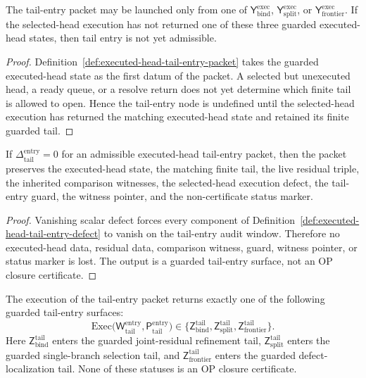 \begin{lemma}
\label{lem:executed-head-is-tail-entry-precondition}
The tail-entry packet may be launched only from one of \(\mathsf Y_{\mathrm{bind}}^{\mathrm{exec}}\), \(\mathsf Y_{\mathrm{split}}^{\mathrm{exec}}\), or \(\mathsf Y_{\mathrm{frontier}}^{\mathrm{exec}}\). If the selected-head execution has not returned one of these three guarded executed-head states, then tail entry is not yet admissible.
\end{lemma}

\begin{proof}
Definition~\ref{def:executed-head-tail-entry-packet} takes the guarded executed-head state as the first datum of the packet. A selected but unexecuted head, a ready queue, or a resolve return does not yet determine which finite tail is allowed to open. Hence the tail-entry node is undefined until the selected-head execution has returned the matching executed-head state and retained its finite guarded tail.
\end{proof}

\begin{lemma}
\label{lem:zero-tail-entry-defect-preserves-tail-entry-data}
If \(\Delta_{\mathrm{tail}}^{\mathrm{entry}}=0\) for an admissible executed-head tail-entry packet, then the packet preserves the executed-head state, the matching finite tail, the live residual triple, the inherited comparison witnesses, the selected-head execution defect, the tail-entry guard, the witness pointer, and the non-certificate status marker.
\end{lemma}

\begin{proof}
Vanishing scalar defect forces every component of Definition~\ref{def:executed-head-tail-entry-defect} to vanish on the tail-entry audit window. Therefore no executed-head data, residual data, comparison witness, guard, witness pointer, or status marker is lost. The output is a guarded tail-entry surface, not an OP closure certificate.
\end{proof}

\begin{definition}
\label{def:executed-head-tail-entry-output}
The execution of the tail-entry packet returns exactly one of the following guarded tail-entry surfaces:
\[
\mathrm{Exec}\bigl(\mathsf W_{\mathrm{tail}}^{\mathrm{entry}},
 \mathsf P_{\mathrm{tail}}^{\mathrm{entry}}\bigr)
\in
\{\mathsf Z_{\mathrm{bind}}^{\mathrm{tail}},
 \mathsf Z_{\mathrm{split}}^{\mathrm{tail}},
 \mathsf Z_{\mathrm{frontier}}^{\mathrm{tail}}\}.
\]
Here \(\mathsf Z_{\mathrm{bind}}^{\mathrm{tail}}\) enters the guarded joint-residual refinement tail, \(\mathsf Z_{\mathrm{split}}^{\mathrm{tail}}\) enters the guarded single-branch selection tail, and \(\mathsf Z_{\mathrm{frontier}}^{\mathrm{tail}}\) enters the guarded defect-localization tail. None of these statuses is an OP closure certificate.
\end{definition}

